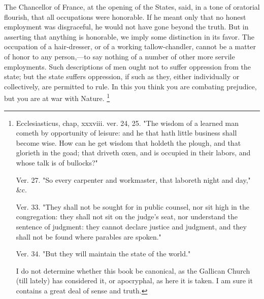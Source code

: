 The Chancellor of France, at the opening of the States, said, in a tone of oratorial flourish, that all occupations were honorable. If he meant only that no honest employment was disgraceful, he would not have gone beyond the truth. But in asserting that anything is honorable, we imply some distinction in its favor. The occupation of a hair-dresser, or of a working tallow-chandler, cannot be a matter of honor to any person,—to say nothing of a number of other more servile employments. Such descriptions of men ought not to suffer oppression from the state; but the state suffers oppression, if such as they, either individually or collectively, are permitted to rule. In this you think you are combating prejudice, but you are at war with Nature.
\footnote{ Ecclesiasticus, chap, xxxviii. ver. 24, 25. "The wisdom of a learned man cometh by opportunity of leisure: and he that hath little business shall become wise. How can he get wisdom that holdeth the plough, and that glorieth in the goad; that driveth oxen, and is occupied in their labors, and whose talk is of bullocks?"

Ver. 27. "So every carpenter and workmaster, that laboreth night and day," \&c.

Ver. 33. "They shall not be sought for in public counsel, nor sit high in the congregation: they shall not sit on the judge's seat, nor understand the sentence of judgment: they cannot declare justice and judgment, and they shall not be found where parables are spoken."

Ver. 34. "But they will maintain the state of the world."

I do not determine whether this book be canonical, as the Gallican Church (till lately) has considered it, or apocryphal, as here it is taken. I am sure it contains a great deal of sense and truth.
}

